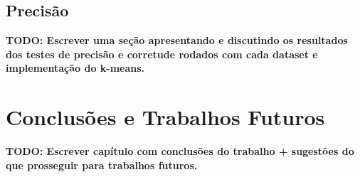 \documentclass[12pt,
openright, 
oneside, %
a4paper,    %
brazil]{facom-ufu-abntex2}
\begin{document}

\section{Precisão}
\label{sec:testesDePrecisao}


\textbf{TODO: Escrever uma seção apresentando e discutindo os resultados dos testes de precisão e corretude rodados com cada dataset e implementação do k-means.}






\chapter{Conclusões e Trabalhos Futuros}


\textbf{TODO: Escrever capítulo com conclusões do trabalho + sugestões do que prosseguir para trabalhos futuros.}











\postextual








  
\end{document}
